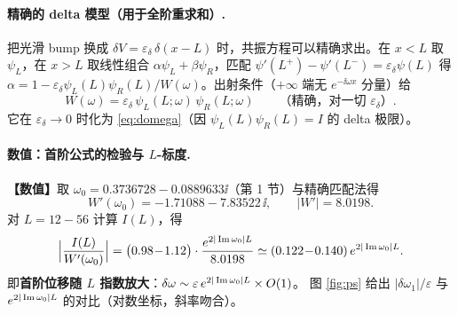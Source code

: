 \paragraph{精确的 delta 模型（用于全阶重求和）.}
把光滑 bump 换成 $\delta V=\varepsilon_\delta\,\delta(x-L)$ 时，共振方程可以精确求出。在 $x<L$ 取
$\psi_L$，在 $x>L$ 取线性组合 $\alpha\psi_L+\beta\psi_R$，匹配
$\psi'(L^+)-\psi'(L^-)=\varepsilon_\delta\psi(L)$ 得
$\alpha=1-\varepsilon_\delta\psi_L(L)\psi_R(L)/W(\omega)$。出射条件（$+\infty$ 端无 $e^{-\ii\omega x}$ 分量）给
\begin{equation}
W(\omega)=\varepsilon_\delta\,\psi_L(L;\omega)\,\psi_R(L;\omega)
\qquad\text{（精确，对一切 }\varepsilon_\delta\text{）}.
\label{eq:deltaexact}
\end{equation}
它在 $\varepsilon_\delta\to0$ 时化为 \eqref{eq:domega}（因 $\psi_L(L)\psi_R(L)=I$ 的 delta 极限）。

\paragraph{数值：首阶公式的检验与 $L$-标度.}
\textbf{【数值】}取 $\omega_0=0.3736728-0.0889633\ii$（第 1 节）与精确匹配法得
\begin{equation}
W'(\omega_0)=-1.71088-7.83522\,\ii,\qquad |W'|=8.0198 .
\end{equation}
对 $L=12\!-\!56$ 计算 $I(L)$，得
\begin{equation}
\Big|\frac{I(L)}{W'(\omega_0)}\Big|=\big(0.98\!-\!1.12\big)\cdot\frac{e^{2|\operatorname{Im}\omega_0|L}}{8.0198}
\simeq (0.122\!-\!0.140)\,e^{2|\operatorname{Im}\omega_0|L}.
\label{eq:K1}
\end{equation}
即\textbf{首阶位移随 $L$ 指数放大}：$\delta\omega\sim\varepsilon\,e^{2|\operatorname{Im}\omega_0|L}\times O(1)$。
图 \ref{fig:ps} 给出 $|\delta\omega_1|/\varepsilon$ 与 $e^{2|\operatorname{Im}\omega_0|L}$ 的对比（对数坐标，斜率吻合）。

